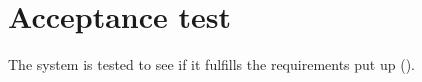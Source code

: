 \chapter{Acceptance test}\label{chap:acceptanceTest}
The system is tested to see if it fulfills the requirements put up ().

